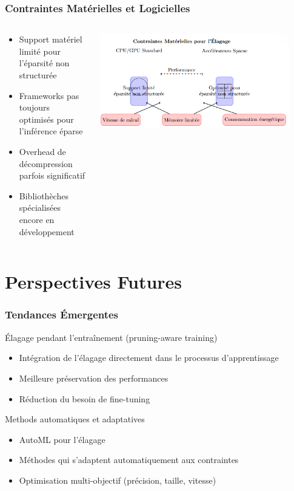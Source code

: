 \documentclass[10pt]{beamer}
\begin{document}
\begin{frame}
\frametitle{Contraintes Matérielles et Logicielles}
\begin{columns}
\begin{column}{0.5\textwidth}
\begin{itemize}
    \item Support matériel limité pour l'éparsité non structurée
    \item Frameworks pas toujours optimisés pour l'inférence éparse
    \item Overhead de décompression parfois significatif
    \item Bibliothèches spécialisées encore en développement
\end{itemize}
\end{column}
\begin{column}{0.5\textwidth}
\centering
\includegraphics[width=0.9\textwidth]{hardware_constraints.jpg}
\end{column}
\end{columns}
\end{frame}

\section{Perspectives Futures}

\begin{frame}
\frametitle{Tendances Émergentes}
\begin{block}{Élagage pendant l'entraînement (pruning-aware training)}
\begin{itemize}
    \item Intégration de l'élagage directement dans le processus d'apprentissage
    \item Meilleure préservation des performances
    \item Réduction du besoin de fine-tuning
\end{itemize}
\end{block}

\begin{block}{Methods automatiques et adaptatives}
\begin{itemize}
    \item AutoML pour l'élagage
    \item Méthodes qui s'adaptent automatiquement aux contraintes
    \item Optimisation multi-objectif (précision, taille, vitesse)
\end{itemize}
\end{block}
\end{frame}
\end{document}
